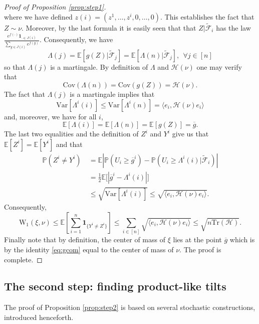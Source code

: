 \documentclass[12pt]{article}
\def \W{\mathrm{W_1}}
\def \EE {\mathbb E}
\def \PP {\mathbb P}
\def \FFF {\mathcal{\tilde F}}
\def \tr {\mathrm{Tr}}
\def \HH {\mathcal{H}}
\theoremstyle{definition}
\theoremstyle{remark}
\begin{document}
\begin{proof}[Proof of Proposition \ref{prop:step1}]
$$$$
where we have defined $z(i) = (z^1,\dots,z^i,0,\dots,0)$. This establishes the fact that $Z \sim \nu$. Moreover, by the last formula it is easily seen that that $Z | \FFF_i$ has the law $\frac{e^{f(\cdot)} \mathbf{1}_{\cdot \in J(i)}} {\sum_{y \in J(i)} e^{f(y)}}$. Consequently, we have
$$
\Lambda(j) = \EE[g(Z) | \FFF_j] = \EE[\Lambda(n) | \FFF_j], ~~ \forall j \in [n]
$$
so that $\Lambda(j)$ is a martingale. By definition of $\Lambda$ and $\HH(\nu)$ one may verify that 
$$
\mathrm{Cov}(\Lambda(n)) = \mathrm{Cov}(g(Z)) = \HH(\nu).
$$
The fact that $\Lambda(j)$ is a martingale implies that
$$
\mathrm{Var}[\Lambda^i(i)] \leq \mathrm{Var}[\Lambda^i(n)] = \langle e_i, \HH(\nu) e_i \rangle
$$
and, moreover, we have for all $i$,
$$
\EE[\Lambda(i)] = \EE[\Lambda(n)] = \EE[g(Z)] = \overline g.
$$
The last two equalities and the definition of $Z^i$ and $Y^i$ give us that $\EE[Z^i]=\EE[Y^i]$ and that
\begin{align*}
\PP(Z^i \neq Y^i) ~& = \EE \left |\PP(U_i \geq \overline g^i) - \PP(U_i \geq \Lambda^i(i) | \FFF_{i}) \right | \\
& = \frac{1}{2} \EE \bigl [ |\overline g^i - \Lambda^i(i)| \bigr] \\
& \leq \sqrt{\mathrm{Var}[\Lambda^i(i)]} \leq \sqrt{\langle e_i, \HH(\nu) e_i \rangle}.
\end{align*}
Consequently,
$$
\W(\xi,\nu) \leq \EE \left [ \sum_{i=1}^n \mathbf{1}_{ \{ Y^i \neq Z^i \}}  \right ] \leq \sum_{i \in [n]} \sqrt{\langle e_i, \HH(\nu) e_i \rangle} \leq \sqrt{n \tr(\HH)}.
$$
Finally note that by definition, the center of mass of $\xi$ lies at the point $\overline g$ which is by the identity \eqref{eq:gcom} equal to the center of mass of $\nu$. The proof is complete.
\end{proof}

\subsection{The second step: finding product-like tilts}
The proof of Proposition \ref{prop:step2} is based on several stochastic constructions, introduced henceforth.
\end{document}
